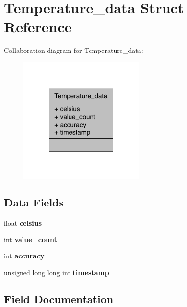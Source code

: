 \section{Temperature\-\_\-data Struct Reference}
\label{structTemperature__data}


Collaboration diagram for Temperature\-\_\-data\-:\nopagebreak
\begin{figure}[H]
\begin{center}
\leavevmode
\includegraphics[width=176pt]{structTemperature__data__coll__graph}
\end{center}
\end{figure}
\subsection*{Data Fields}
\begin{DoxyCompactItemize}
\item 
float {\bfseries celsius}\label{structTemperature__data_a989ee315359e368db60feedf2cc757b5}

\item 
int {\bfseries value\-\_\-count}\label{structTemperature__data_a1cb36d1b40a8eea0d86d8228600b6284}

\item 
int {\bfseries accuracy}\label{structTemperature__data_a086c83e758be545e7878ea7c4fe98f23}

\item 
unsigned long long int {\bfseries timestamp}\label{structTemperature__data_a162bed85d7ec6f68285d6b7421a2a507}

\end{DoxyCompactItemize}


\subsection{Field Documentation}
